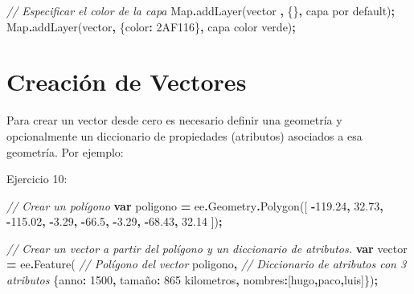 \documentclass[
  12pt,
  letterpaper,
  twoside]{book}
\newenvironment{Shaded}{\begin{snugshade}}{\end{snugshade}}
\newcommand{\AttributeTok}[1]{\textcolor[rgb]{0.77,0.63,0.00}{#1}}
\newcommand{\BuiltInTok}[1]{#1}
\newcommand{\CommentTok}[1]{\textcolor[rgb]{0.56,0.35,0.01}{\textit{#1}}}
\newcommand{\DataTypeTok}[1]{\textcolor[rgb]{0.13,0.29,0.53}{#1}}
\newcommand{\DecValTok}[1]{\textcolor[rgb]{0.00,0.00,0.81}{#1}}
\newcommand{\FloatTok}[1]{\textcolor[rgb]{0.00,0.00,0.81}{#1}}
\newcommand{\FunctionTok}[1]{\textcolor[rgb]{0.00,0.00,0.00}{#1}}
\newcommand{\KeywordTok}[1]{\textcolor[rgb]{0.13,0.29,0.53}{\textbf{#1}}}
\newcommand{\NormalTok}[1]{#1}
\newcommand{\OperatorTok}[1]{\textcolor[rgb]{0.81,0.36,0.00}{\textbf{#1}}}
\newcommand{\StringTok}[1]{\textcolor[rgb]{0.31,0.60,0.02}{#1}}
\begin{document}
\begin{Shaded}
\begin{Highlighting}[]
\CommentTok{// Especificar el color de la capa }
\BuiltInTok{Map}\OperatorTok{.}\FunctionTok{addLayer}\NormalTok{(vector }\OperatorTok{,}\NormalTok{ \{\}}\OperatorTok{,} \StringTok{\textquotesingle{}capa por default\textquotesingle{}}\NormalTok{)}\OperatorTok{;}
\BuiltInTok{Map}\OperatorTok{.}\FunctionTok{addLayer}\NormalTok{(vector}\OperatorTok{,}\NormalTok{ \{}\DataTypeTok{color}\OperatorTok{:} \StringTok{\textquotesingle{}2AF116\textquotesingle{}}\NormalTok{\}}\OperatorTok{,} \StringTok{\textquotesingle{}capa color verde\textquotesingle{}}\NormalTok{)}\OperatorTok{;}
\end{Highlighting}
\end{Shaded}

\hypertarget{creaciuxf3n-de-vectores}{%
\section{Creación de Vectores}\label{creaciuxf3n-de-vectores}}

Para crear un vector desde cero es necesario definir una geometría y opcionalmente un diccionario de propiedades (atributos) asociados a esa geometría. Por ejemplo:

Ejercicio 10:

\begin{Shaded}
\begin{Highlighting}[]
\CommentTok{// Crear un polígono}
\KeywordTok{var}\NormalTok{ poligono }\OperatorTok{=}\NormalTok{ ee}\OperatorTok{.}\AttributeTok{Geometry}\OperatorTok{.}\FunctionTok{Polygon}\NormalTok{([}
  \OperatorTok{{-}}\FloatTok{119.24}\OperatorTok{,} \FloatTok{32.73}\OperatorTok{,}
  \OperatorTok{{-}}\FloatTok{115.02}\OperatorTok{,} \OperatorTok{{-}}\FloatTok{3.29}\OperatorTok{,}
  \OperatorTok{{-}}\FloatTok{66.5}\OperatorTok{,} \OperatorTok{{-}}\FloatTok{3.29}\OperatorTok{,}
  \OperatorTok{{-}}\FloatTok{68.43}\OperatorTok{,} \FloatTok{32.14}
\NormalTok{])}\OperatorTok{;}

\CommentTok{// Crear un vector a partir del polígono y un diccionario de atributos.}
\KeywordTok{var}\NormalTok{ vector }\OperatorTok{=}\NormalTok{ ee}\OperatorTok{.}\FunctionTok{Feature}\NormalTok{(}
  \CommentTok{// Polígono del vector}
\NormalTok{  poligono}\OperatorTok{,}                      
  \CommentTok{// Diccionario de atributos con 3 atributos}
\NormalTok{  \{}\DataTypeTok{anno}\OperatorTok{:} \DecValTok{1500}\OperatorTok{,}                    
  \DataTypeTok{tamaño}\OperatorTok{:} \StringTok{\textquotesingle{}865 kilometros\textquotesingle{}}\OperatorTok{,}
  \DataTypeTok{nombres}\OperatorTok{:}\NormalTok{[}\StringTok{\textquotesingle{}hugo\textquotesingle{}}\OperatorTok{,}\StringTok{\textquotesingle{}paco\textquotesingle{}}\OperatorTok{,}\StringTok{\textquotesingle{}luis\textquotesingle{}}\NormalTok{]\})}\OperatorTok{;}
\end{Highlighting}
\end{Shaded}
\end{document}
